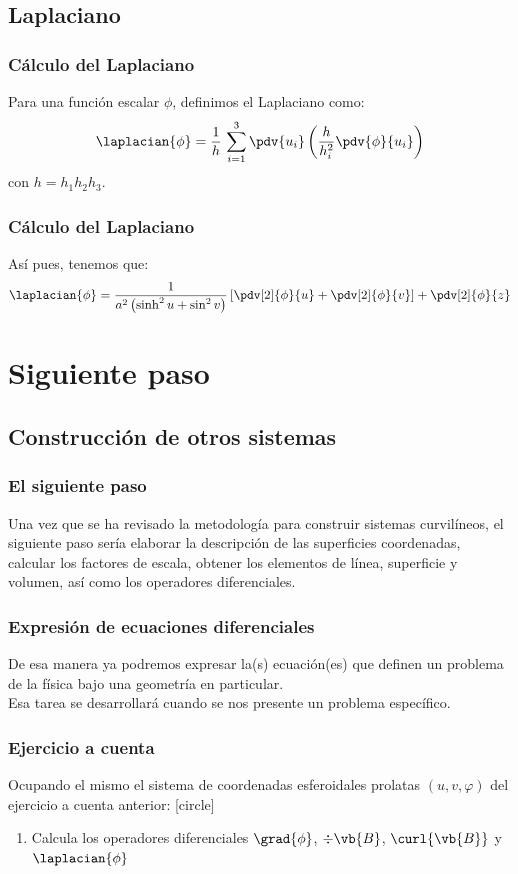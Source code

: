 \subsection{Laplaciano}
\begin{frame}
\frametitle{Cálculo del Laplaciano}
Para una función escalar $\phi$, definimos el Laplaciano como:
\begin{align*}
\laplacian{\phi} = \dfrac{1}{h} \, \sum_{i=1}^{3} \pdv{u_{i}} \left( \dfrac{h}{h_{i}^{2}}  \pdv{\phi}{u_{i}} \right)
\end{align*}
con $h = h_{1} h_{2} h_{3}$.
\end{frame}
\begin{frame}
\frametitle{Cálculo del Laplaciano}
Así pues, tenemos que:
\begin{align*}
\laplacian{\phi} = \dfrac{1}{a^{2} \left( \sinh^{2} u + \sin^{2} v \right)} \left[ \pdv[2]{\phi}{u} + \pdv[2]{\phi}{v} \right] + \pdv[2]{\phi}{z}
\end{align*}
\end{frame}
\section{Siguiente paso}
\subsection{Construcción de otros sistemas}
\begin{frame}
\frametitle{El siguiente paso}
Una vez que se ha revisado la metodología para construir sistemas curvilíneos, el siguiente paso sería elaborar la descripción de las superficies coordenadas, calcular los factores de escala, obtener los elementos de línea, superficie y volumen, así como los operadores diferenciales.
\end{frame}
\begin{frame}
\frametitle{Expresión de ecuaciones diferenciales}
De esa manera ya podremos expresar la(s) ecuación(es) que definen un problema de la física bajo una geometría en particular.
\\
\bigskip
Esa tarea se desarrollará cuando se nos presente un problema específico.
\end{frame}
\begin{frame}
\frametitle{Ejercicio a cuenta}
Ocupando el mismo el sistema de coordenadas esferoidales prolatas $(u, v, \varphi)$ del ejercicio a cuenta anterior:
[circle]
\begin{enumerate}
\item Calcula los operadores diferenciales $\grad{\phi}$, $\div{\vb{B}}$, $\curl{\vb{B}}$ y $\laplacian{\phi}$
\end{enumerate}
\end{frame}
